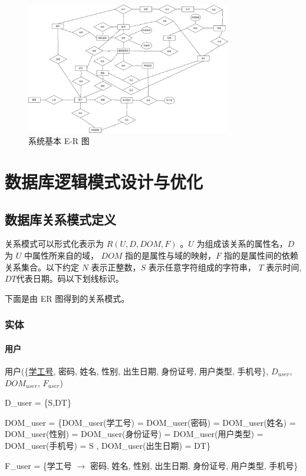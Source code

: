 \documentclass{article}
\begin{document}
\begin{figure}[H]
    \centering
    \includegraphics[width=0.8\textwidth]{images/basicER.png}
    \caption{系统基本 E-R 图}
\end{figure}

\section{数据库逻辑模式设计与优化}
\subsection{数据库关系模式定义}
关系模式可以形式化表⽰为 $R(U, D, DOM, F)$ 。$U$ 为组成该关系的属性名，$D$ 为 $U$ 中属性所来⾃的域，
$DOM$ 指的是属性与域的映射，$F$ 指的是属性间的依赖关系集合。以下约定 $N$ 表示正整数，$S$ 表示任意字符组成的字符串， $T$ 表示时间, $DT$代表日期。码以下划线标识。

下面是由 ER 图得到的关系模式。

\subsubsection{实体}

\paragraph{用户}

用户(\{\underline{学工号}, 密码, 姓名, 性别, 出生日期, 身份证号, 用户类型, 手机号\}, $D_{user}$, $DOM_{user}$, $F_{user}$)

D\_user = \{S,DT\}

DOM\_user = \{DOM\_user(学工号) = DOM\_user(密码) = DOM\_user(姓名) = DOM\_user(性别) = DOM\_user(身份证号) = DOM\_user(用户类型) = DOM\_user(手机号) = S , DOM\_user(出生日期) = DT\}

F\_user = \{学工号 $\rightarrow$ 密码, 姓名, 性别, 出生日期, 身份证号, 用户类型, 手机号\}
\end{document}
